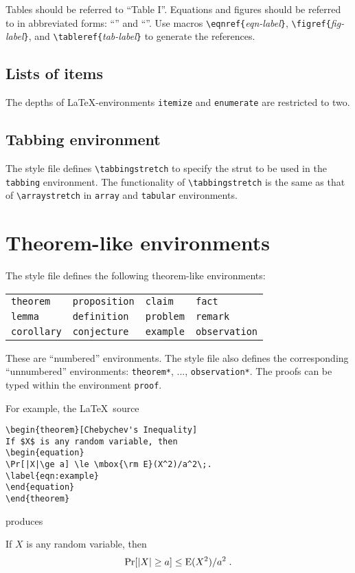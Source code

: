 \documentclass{DIKU-article}[2006/05/09]
\begin{document}
Tables should be referred to ``Table I''.  Equations and figures
should be referred to in abbreviated forms: ``''
and ``''.  Use macros
\verb|\eqnref{|\emph{eqn-label}\verb|}|,
\verb|\figref{|\emph{fig-label}\verb|}|, and
\verb|\tableref{|\emph{tab-label}\verb|}| to generate the references.

\subsection{Lists of items}

The depths of \LaTeX-environments \verb|itemize| and \verb|enumerate|
are restricted to two.

\subsection{Tabbing environment}

The style file defines \verb|\tabbingstretch| to specify the strut
to be used in the \texttt{tabbing} environment. The functionality of
\verb|\tabbingstretch| is the same as that of \verb|\arraystretch|
in \texttt{array} and \texttt{tabular} environments.

\section{Theorem-like environments}

The style file defines the following theorem-like environments:
\begin{center}
\begin{tabular}{llll}
\verb|theorem|	& \verb|proposition|	& \verb|claim|	& \verb|fact| \\

\verb|lemma|	& \verb|definition|	& \verb|problem|& \verb|remark| \\

\verb|corollary|& \verb|conjecture|	& \verb|example|&  \verb|observation|
\end{tabular}
\end{center}
These are ``numbered'' environments.  The style file also defines the
corresponding ``unnumbered'' environments: \verb|theorem*|, ...,
\verb|observation*|.  The proofs can be typed within the environment
\verb|proof|.

For example, the \LaTeX\ source
\begin{verbatim}
\begin{theorem}[Chebychev's Inequality]
If $X$ is any random variable, then
\begin{equation}
\Pr[|X|\ge a] \le \mbox{\rm E}(X^2)/a^2\;.
\label{eqn:example}
\end{equation}
\end{theorem}
\end{verbatim}
produces
\begin{theorem}
If $X$ is any random variable, then
\begin{equation}
\Pr[|X|\ge a] \le \mbox{\rm E}(X^2)/a^2\;.
\label{eqn:example}
\end{equation}
\end{theorem}
\end{document}
